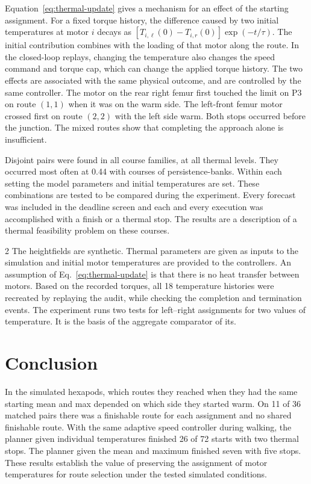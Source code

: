\documentclass{ieeeaccess}
\begin{document}
Equation~\eqref{eq:thermal-update} gives a mechanism for an effect of the starting assignment. For a fixed torque history, the difference caused by two initial temperatures at motor $i$ decays as $[T_{i,\ell}(0)-T_{i,r}(0)]\exp(-t/\tau)$. The initial contribution combines with the loading of that motor along the route. In the closed-loop replays, changing the temperature also changes the speed command and torque cap, which can change the applied torque history. The two effects are associated with the same physical outcome, and are controlled by the same controller. The motor on the rear right femur first touched the limit on P3 on route $(1,1)$ when it was on the warm side. The left-front femur motor crossed first on route $(2,2)$ with the left side warm. Both stops occurred before the junction. The mixed routes show that completing the approach alone is insufficient.

Disjoint pairs were found in all course families, at all thermal levels. They occurred most often at 0.44 with courses of persistence-banks. Within each setting the model parameters and initial temperatures are set. These combinations are tested to be compared during the experiment. Every forecast was included in the deadline screen and each and every execution was accomplished with a finish or a thermal stop. The results are a description of a thermal feasibility problem on these courses.

\onecolumn
\raggedbottom
\begin{multicols}{2}
The heightfields are synthetic. Thermal parameters are given as inputs to the simulation and initial motor temperatures are provided to the controllers. An assumption of Eq.~\eqref{eq:thermal-update} is that there is no heat transfer between motors. Based on the recorded torques, all 18 temperature histories were recreated by replaying the audit, while checking the completion and termination events. The experiment runs two tests for left--right assignments for two values of temperature. It is the basis of the aggregate comparator of its.

\section{Conclusion}

In the simulated hexapods, which routes they reached when they had the same starting mean and max depended on which side they started warm. On 11 of 36 matched pairs there was a finishable route for each assignment and no shared finishable route. With the same adaptive speed controller during walking, the planner given individual temperatures finished 26 of 72 starts with two thermal stops. The planner given the mean and maximum finished seven with five stops. These results establish the value of preserving the assignment of motor temperatures for route selection under the tested simulated conditions.

\end{multicols}
\end{document}
